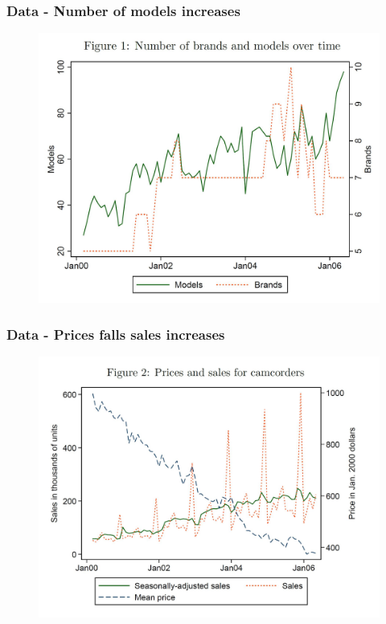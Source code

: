 \documentclass{beamer}
\theoremstyle{definition}
\begin{document}
\begin{frame}
  \frametitle{Data - Number of models increases}

  \begin{figure}
    \includegraphics[width=\linewidth]{1.JPG}
  \end{figure}
\end{frame}

\begin{frame}
  \frametitle{Data - Prices falls sales increases}

  \begin{figure}
    \includegraphics[width=\linewidth]{2.JPG}
  \end{figure}
\end{frame}
\end{document}
